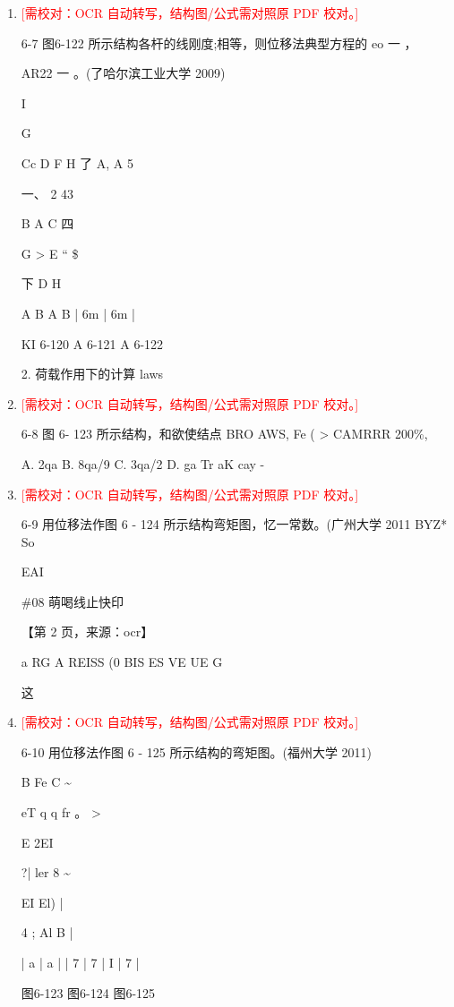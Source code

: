 \documentclass[UTF8,12pt,a4paper,openany]{ctexbook}
\newcommand{\TODO}[1]{\textcolor{red}{[需校对：#1]}}
\begin{document}
\begin{enumerate}[label=\textbf{\arabic*.},leftmargin=2em]
\item \TODO{OCR 自动转写，结构图/公式需对照原 PDF 校对。}\par 6-7 图6-122 所示结构各杆的线刚度;相等，则位移法典型方程的 eo 一        ，\par AR22 一     。(了哈尔滨工业大学 2009)\par I\par G\par Cc    D    F     H           了      A,         A           5\par 一、         2        43\par B       A       C      四\par G     >     E     “                           \$\par 下    D       H\par A          B     A          B       |   6m   |   6m   |\par KI 6-120            A 6-121                  A 6-122\par 2. 荷载作用下的计算                                      laws
\item \TODO{OCR 自动转写，结构图/公式需对照原 PDF 校对。}\par 6-8 图 6- 123 所示结构，和欲使结点 BRO AWS, Fe ( > CAMRRR 200\%,\par A. 2qa         B. 8qa/9        C. 3qa/2        D. ga     Tr aK cay -
\item \TODO{OCR 自动转写，结构图/公式需对照原 PDF 校对。}\par 6-9 用位移法作图 6 - 124 所示结构弯矩图，忆一常数。(广州大学 2011 BYZ*  So\par EAI\par \#08                                                    萌喝线止快印\par \par 【第 2 页，来源：ocr】\par a RG A REISS (0 BIS ES VE UE G\par 这
\item \TODO{OCR 自动转写，结构图/公式需对照原 PDF 校对。}\par 6-10 用位移法作图 6 - 125 所示结构的弯矩图。(福州大学 2011)\par B           Fe       C                                           \textasciitilde{}\par eT                              q          q                      fr            。              >\par E                     2EI\par ?| ler                       8                                      \textasciitilde{}\par EI          El) |\par 4                                                       ;                                Al            B   |\par |    a     |     a     |              |     7      |      7                    |       I        |        7       |\par 图6-123                图6-124       图6-125

\end{enumerate}
\end{document}
